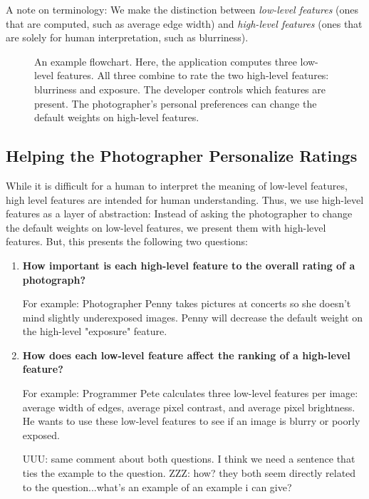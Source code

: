 \documentclass[11pt,letter]{article}
\begin{document}
A note on terminology: We make the distinction between \textit{low-level features} (ones that are computed, such as average edge width) and \textit{high-level features} (ones that are solely for human interpretation, such as blurriness).

\begin{figure*}[b!]
  \centering
  \caption{An example flowchart. Here, the application computes three low-level features. All three combine to rate the two high-level features: blurriness and exposure. The developer controls which features are present. The photographer's personal preferences can change the default weights on high-level features.}
  \label{fig:flowchart}
\end{figure*}

\subsection{Helping the Photographer Personalize Ratings}
\label{abstraction}
While it is difficult for a human to interpret the meaning of low-level features, high level features are intended for human understanding. Thus, we use high-level features as a layer of abstraction: Instead of asking the photographer to change the default weights on low-level features, we present them with high-level features. But, this presents the following two questions:

\begin{enumerate}
\item \textbf{How important is each high-level feature to the overall rating of a photograph?}


For example: Photographer Penny takes pictures at concerts so she doesn't mind slightly underexposed images. Penny will decrease the default weight on the high-level "exposure" feature.

\item \textbf{How does each low-level feature affect the ranking of a high-level feature?}


For example: Programmer Pete calculates three low-level features per image: average width of edges, average pixel contrast, and average pixel brightness. He wants to use these low-level features to see if an image is blurry or poorly exposed.

UUU: same comment about both questions. I think we need a sentence that ties the example to the question.
ZZZ: how? they both seem directly related to the question...what's an example of an example i can give?

\end{enumerate}
\end{document}
